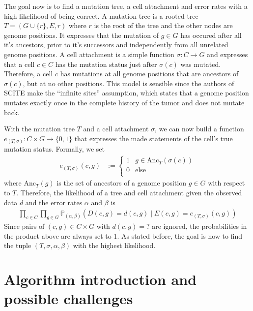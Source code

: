The goal now is to find a mutation tree, a cell attachment and error rates with a high likelihood of being correct. A mutation tree is a rooted tree $T = (G \cup \{r\}, E, r)$ where $r$ is the root of the tree and the other nodes are genome positions. It expresses that the mutation of $g \in G$ has occured after all it's ancestors, prior to it's successors and independently from all unrelated genome positions. A cell attachment is a simple function $\sigma: C \rightarrow G$ and expresses that a cell $c \in C$ has the mutation status just after $\sigma(c)$ was mutated. Therefore, a cell $c$ has mutations at all genome positions that are ancestors of $\sigma(c)$, but at no other positions. This model is sensible since the authors of \ac{SCITE} make the ``infinite sites'' assumption, which states that a genome position mutates exactly once in the complete history of the tumor and does not mutate back.

With the mutation tree $T$ and a cell attachment $\sigma$, we can now build a function $e_{(T, \sigma)}: C \times G \rightarrow \{0, 1\}$ that expresses the made statements of the cell's true mutation status. Formally, we set
\begin{align*}
    e_{(T, \sigma)}(c, g) &:= \begin{cases}
        1 & g \in \mathrm{Anc}_T(\sigma(c)) \\
        0 & \text{else} \\
    \end{cases}
\end{align*}
where $\mathrm{Anc}_T(g)$ is the set of ancestors of a genome position $g \in G$ with respect to $T$. Therefore, the likelihood of a tree and cell attachment given the observed data $d$ and the error rates $\alpha$ and $\beta$ is
\begin{align*}
    \prod_{c \in C}\prod_{g \in G} \mathbb{P}_{(\alpha, \beta)}(D(c, g) = d(c, g) \mid E(c, g) = e_{(T, \sigma)}(c, g))
\end{align*}
Since pairs of $(c, g) \in C \times G$ with $d(c, g) = ?$ are ignored, the probabilities in the product above are always set to 1. As stated before, the goal is now to find the tuple $(T, \sigma, \alpha, \beta)$ with the highest likelihood.

\section{Algorithm introduction and possible challenges}

